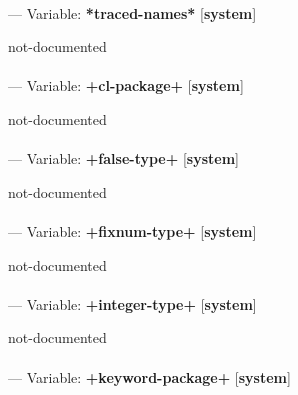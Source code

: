 \paragraph{}
\label{SYSTEM:*TRACED-NAMES*}
--- Variable: \textbf{*traced-names*} [\textbf{system}] \textit{}

\begin{adjustwidth}{5em}{5em}
not-documented
\end{adjustwidth}

\paragraph{}
\label{SYSTEM:+CL-PACKAGE+}
--- Variable: \textbf{+cl-package+} [\textbf{system}] \textit{}

\begin{adjustwidth}{5em}{5em}
not-documented
\end{adjustwidth}

\paragraph{}
\label{SYSTEM:+FALSE-TYPE+}
--- Variable: \textbf{+false-type+} [\textbf{system}] \textit{}

\begin{adjustwidth}{5em}{5em}
not-documented
\end{adjustwidth}

\paragraph{}
\label{SYSTEM:+FIXNUM-TYPE+}
--- Variable: \textbf{+fixnum-type+} [\textbf{system}] \textit{}

\begin{adjustwidth}{5em}{5em}
not-documented
\end{adjustwidth}

\paragraph{}
\label{SYSTEM:+INTEGER-TYPE+}
--- Variable: \textbf{+integer-type+} [\textbf{system}] \textit{}

\begin{adjustwidth}{5em}{5em}
not-documented
\end{adjustwidth}

\paragraph{}
\label{SYSTEM:+KEYWORD-PACKAGE+}
--- Variable: \textbf{+keyword-package+} [\textbf{system}] \textit{}

